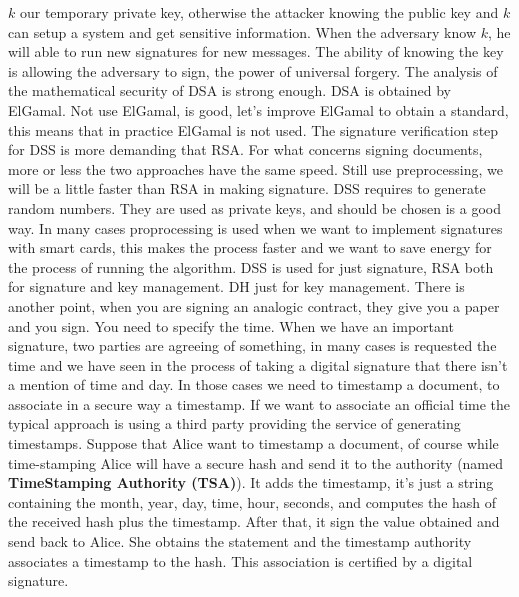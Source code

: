 \documentclass[11pt]{article}
\begin{document}
$k$ our temporary private key, otherwise the attacker knowing the public key and $k$ can setup a system and get sensitive information. When the adversary know $k$, he will able to run new signatures for new messages. The ability of knowing the key is allowing the adversary to sign, the power of universal forgery. The analysis of the mathematical security of DSA is strong enough. DSA is obtained by ElGamal. Not use ElGamal, is good, let's improve ElGamal to obtain a standard, this means that in practice ElGamal is not used. The signature verification step for DSS is more demanding that RSA. For what concerns signing documents, more or less the two approaches have the same speed. Still use preprocessing, we will be a little faster than RSA in making signature. DSS requires to generate random numbers. They are used as private keys, and should be chosen is a good way. In many cases proprocessing is used when we want to implement signatures with smart cards, this makes the process faster and we want to save energy for the process of running the algorithm. DSS is used for just signature, RSA both for signature and key management. DH just for key management. There is another point, when you are signing an analogic contract, they give you a paper and you sign. You need to specify the time. When we have an important signature, two parties are agreeing of something, in many cases is requested the time and we have seen in the process of taking a digital signature that there isn't a mention of time and day. In those cases we need to timestamp a document, to associate in a secure way a timestamp. If we want to associate an official time the typical approach is using a third party providing the service of generating timestamps. Suppose that Alice want to timestamp a document, of course while time-stamping Alice will have a secure hash and send it to the authority (named \textbf{TimeStamping Authority (TSA)}). It adds the timestamp, it's just a string containing the month, year, day, time, hour, seconds, and computes the hash of the received hash plus the timestamp. After that, it sign the value obtained and send back to Alice. She obtains the statement and the timestamp authority associates a timestamp to the hash. This association is certified by a digital signature.
\end{document}
